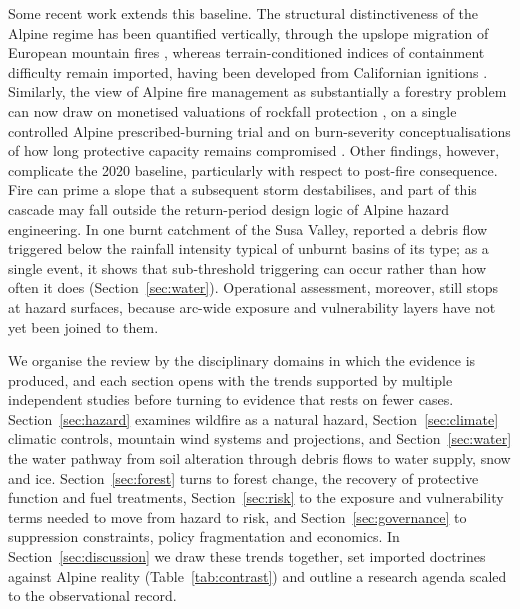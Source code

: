 \documentclass[11pt,a4paper]{article}
\begin{document}
Some recent work extends this baseline. The structural distinctiveness of the Alpine regime has been quantified vertically, through the upslope migration of European mountain fires \citep{beloiu_climatedriven_2026}, whereas terrain-conditioned indices of containment difficulty remain imported, having been developed from Californian ignitions \citep{cardil_assessing_2025}. Similarly, the view of Alpine fire management as substantially a forestry problem can now draw on monetised valuations of rockfall protection \citep{accastello_asforesee_2019, moos_climate_2021}, on a single controlled Alpine prescribed-burning trial \citep{gamba_prescribed_2025} and on burn-severity conceptualisations of how long protective capacity remains compromised \citep{melzner_wildfire-induced_2025}. Other findings, however, complicate the 2020 baseline, particularly with respect to post-fire consequence. Fire can prime a slope that a subsequent storm destabilises, and part of this cascade may fall outside the return-period design logic of Alpine hazard engineering. In one burnt catchment of the Susa Valley, \citet{laporta_postwildfire_2025} reported a debris flow triggered below the rainfall intensity typical of unburnt basins of its type; as a single event, it shows that sub-threshold triggering can occur rather than how often it does (Section~\ref{sec:water}). Operational assessment, moreover, still stops at hazard surfaces, because arc-wide exposure and vulnerability layers have not yet been joined to them.

We organise the review by the disciplinary domains in which the evidence is produced, and each section opens with the trends supported by multiple independent studies before turning to evidence that rests on fewer cases. Section~\ref{sec:hazard} examines wildfire as a natural hazard, Section~\ref{sec:climate} climatic controls, mountain wind systems and projections, and Section~\ref{sec:water} the water pathway from soil alteration through debris flows to water supply, snow and ice. Section~\ref{sec:forest} turns to forest change, the recovery of protective function and fuel treatments, Section~\ref{sec:risk} to the exposure and vulnerability terms needed to move from hazard to risk, and Section~\ref{sec:governance} to suppression constraints, policy fragmentation and economics. In Section~\ref{sec:discussion} we draw these trends together, set imported doctrines against Alpine reality (Table~\ref{tab:contrast}) and outline a research agenda scaled to the observational record.

\end{document}
